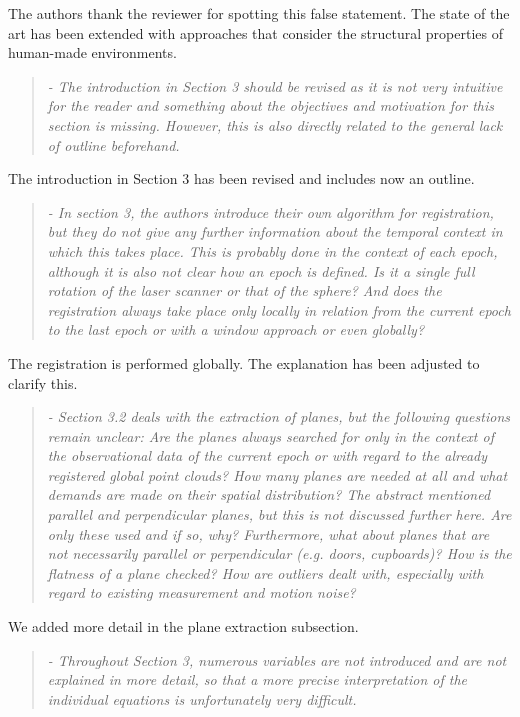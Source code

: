 \documentclass{article}
\newenvironment{itquote}
  {\begin{quote}\itshape}
  {\end{quote}\ignorespacesafterend}
\begin{document}
The authors thank the reviewer for spotting this false statement. The state
of the art has been extended with approaches that consider the structural
properties of human-made environments.

\begin{itquote}
- The introduction in Section 3 should be revised as it is not very
intuitive for the reader and something about the objectives and
motivation for this section is missing. However, this is also
directly related to the general lack of outline beforehand.
\end{itquote}

The introduction in Section 3 has been revised and includes now an outline.
 
\begin{itquote}
- In section 3, the authors introduce their own algorithm for
registration, but they do not give any further information about the
temporal context in which this takes place. This is probably done in
the context of each epoch, although it is also not clear how an
epoch is defined. Is it a single full rotation of the laser scanner
or that of the sphere? And does the registration always take place
only locally in relation from the current epoch to the last epoch or
with a window approach or even globally?
\end{itquote}

The registration is performed globally. The explanation has been adjusted to clarify this.

\begin{itquote}
- Section 3.2 deals with the extraction of planes, but the following
questions remain unclear: Are the planes always searched for only in
the context of the observational data of the current epoch or with
regard to the already registered global point clouds? How many
planes are needed at all and what demands are made on their spatial
distribution? The abstract mentioned parallel and perpendicular
planes, but this is not discussed further here. Are only these used
and if so, why? Furthermore, what about planes that are not
necessarily parallel or perpendicular (e.g. doors, cupboards)? How
is the flatness of a plane checked? How are outliers dealt with,
especially with regard to existing measurement and motion noise?
\end{itquote}

We added more detail in the plane extraction subsection. 

\begin{itquote}
- Throughout Section 3, numerous variables are not introduced and
are not explained in more detail, so that a more precise
interpretation of the individual equations is unfortunately very
difficult.
\end{itquote}
\end{document}
